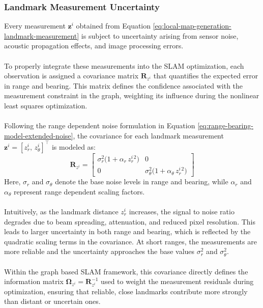\subsubsection{Landmark Measurement Uncertainty}
Every measurement $\mathbf{z}^i$ obtained from Equation \ref{eq:local-map-generation-landmark-measurement} is subject to uncertainty arising from sensor noise, acoustic propagation effects, and image processing errors.  
\\ \\
To properly integrate these measurements into the SLAM optimization, each observation is assigned a covariance matrix $\mathbf{R}_{z^i}$ that quantifies the expected error in range and bearing. This matrix defines the confidence associated with the measurement constraint in the graph, weighting its influence during the nonlinear least squares optimization.  
\\ \\
Following the range dependent noise formulation in Equation \ref{eq:range-bearing-model-extended-noise}, the covariance for each landmark measurement $\mathbf{z}^i = [z_r^i,\, z_\theta^i]^\top$ is modeled as:
\begin{equation}
    \mathbf{R}_{z^i} =
    \begin{bmatrix}
        \sigma_r^2 \big(1 + \alpha_r\, z_r^{i\,2}\big) & 0 \\[0.4em]
        0 & \sigma_\theta^2 \big(1 + \alpha_\theta\, z_r^{i\,2}\big)
    \end{bmatrix}
    \label{eq:local-map-generation-landmark-measurement-uncertainty}
\end{equation}
Here, $\sigma_r$ and $\sigma_\theta$ denote the base noise levels in range and bearing, while $\alpha_r$ and $\alpha_\theta$ represent range dependent scaling factors.  
\\ \\
Intuitively, as the landmark distance $z_r^i$ increases, the signal to noise ratio degrades due to beam spreading, attenuation, and reduced pixel resolution. This leads to larger uncertainty in both range and bearing, which is reflected by the quadratic scaling terms in the covariance. At short ranges, the measurements are more reliable and the uncertainty approaches the base values $\sigma_r^2$ and $\sigma_\theta^2$.  
\\ \\
Within the graph based SLAM framework, this covariance directly defines the information matrix $\mathbf{\Omega}_{z^i} = \mathbf{R}_{z^i}^{-1}$ used to weight the measurement residuals during optimization, ensuring that reliable, close landmarks contribute more strongly than distant or uncertain ones.



